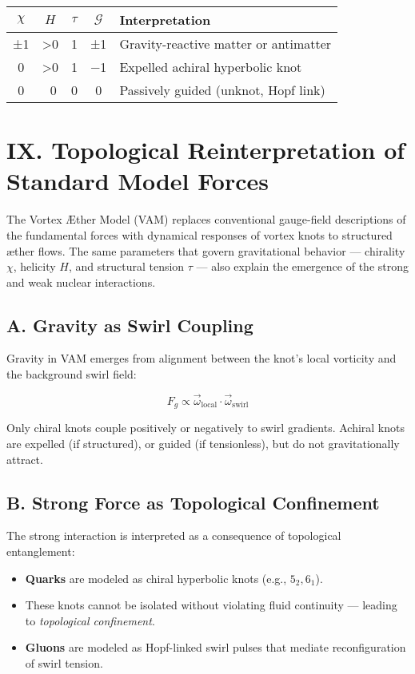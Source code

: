 \documentclass[12pt]{article}
\begin{document}
\begin{center}
\begin{tabular}{|c|c|c|c|l|}
\hline
\( \chi \) & \( H \) & \( \tau \) & \( \mathcal{G} \) & Interpretation \\
\hline
±1 & >0 & 1 & ±1 & Gravity-reactive matter or antimatter \\
0 & >0 & 1 & −1 & Expelled achiral hyperbolic knot \\
0 & ~0 & 0 & 0 & Passively guided (unknot, Hopf link) \\
\hline
\end{tabular}
\end{center}



\section*{IX. Topological Reinterpretation of Standard Model Forces}

The Vortex Æther Model (VAM) replaces conventional gauge-field descriptions of the fundamental forces with dynamical responses of vortex knots to structured æther flows. The same parameters that govern gravitational behavior — chirality \( \chi \), helicity \( H \), and structural tension \( \tau \) — also explain the emergence of the strong and weak nuclear interactions.

\subsection*{A. Gravity as Swirl Coupling}

Gravity in VAM emerges from alignment between the knot’s local vorticity and the background swirl field:

\[
F_g \propto \vec{\omega}_{\text{local}} \cdot \vec{\omega}_{\text{swirl}}
\]

Only chiral knots couple positively or negatively to swirl gradients. Achiral knots are expelled (if structured), or guided (if tensionless), but do not gravitationally attract.

\subsection*{B. Strong Force as Topological Confinement}

The strong interaction is interpreted as a consequence of topological entanglement:

\begin{itemize}
    \item \textbf{Quarks} are modeled as chiral hyperbolic knots (e.g., \( 5_2, 6_1 \)).
    \item These knots cannot be isolated without violating fluid continuity — leading to \emph{topological confinement}.
    \item \textbf{Gluons} are modeled as Hopf-linked swirl pulses that mediate reconfiguration of swirl tension.
\end{itemize}
\end{document}
